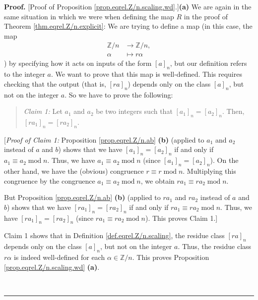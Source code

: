 \documentclass[numbers=enddot,12pt,final,onecolumn,notitlepage]{scrartcl}%
\numberwithin{exer}{subsection}
\theoremstyle{definition}
\newenvironment{statement}{\begin{quote}}{\end{quote}}
\newenvironment{proof}[1][Proof]{\noindent\textbf{#1.} }{\ \rule{0.5em}{0.5em}}
\begin{document}
\begin{proof}
[Proof of Proposition \ref{prop.eqrel.Z/n.scaling.wd}.]\textbf{(a)} We are
again in the same situation in which we were when defining the map $R$ in the
proof of Theorem \ref{thm.eqrel.Z/n.explicit}: We are trying to define a map
(in this case, the map%
\begin{align*}
\mathbb{Z}/n  &  \rightarrow\mathbb{Z}/n,\\
\alpha &  \mapsto r\alpha
\end{align*}
) by specifying how it acts on inputs of the form $\left[  a\right]  _{n}$,
but our definition refers to the integer $a$. We want to prove that this map
is well-defined. This requires checking that the output (that is, $\left[
ra\right]  _{n}$) depends only on the class $\left[  a\right]  _{n}$, but not
on the integer $a$. So we have to prove the following:

\begin{statement}
\textit{Claim 1:} Let $a_{1}$ and $a_{2}$ be two integers such that $\left[
a_{1}\right]  _{n}=\left[  a_{2}\right]  _{n}$. Then, $\left[  ra_{1}\right]
_{n}=\left[  ra_{2}\right]  _{n}$.
\end{statement}

[\textit{Proof of Claim 1:} Proposition \ref{prop.eqrel.Z/n.ab} \textbf{(b)}
(applied to $a_{1}$ and $a_{2}$ instead of $a$ and $b$) shows that we have
$\left[  a_{1}\right]  _{n}=\left[  a_{2}\right]  _{n}$ if and only if
$a_{1}\equiv a_{2}\operatorname{mod}n$. Thus, we have $a_{1}\equiv
a_{2}\operatorname{mod}n$ (since $\left[  a_{1}\right]  _{n}=\left[
a_{2}\right]  _{n}$). On the other hand, we have the (obvious) congruence
$r\equiv r\operatorname{mod}n$. Multiplying this congruence by the congruence
$a_{1}\equiv a_{2}\operatorname{mod}n$, we obtain $ra_{1}\equiv ra_{2}%
\operatorname{mod}n$.

But Proposition \ref{prop.eqrel.Z/n.ab} \textbf{(b)} (applied to $ra_{1}$ and
$ra_{2}$ instead of $a$ and $b$) shows that we have $\left[  ra_{1}\right]
_{n}=\left[  ra_{2}\right]  _{n}$ if and only if $ra_{1}\equiv ra_{2}%
\operatorname{mod}n$. Thus, we have $\left[  ra_{1}\right]  _{n}=\left[
ra_{2}\right]  _{n}$ (since $ra_{1}\equiv ra_{2}\operatorname{mod}n$). This
proves Claim 1.]

Claim 1 shows that in Definition \ref{def.eqrel.Z/n.scaling}, the residue
class $\left[  ra\right]  _{n}$ depends only on the class $\left[  a\right]
_{n}$, but not on the integer $a$. Thus, the residue class $r\alpha$ is indeed
well-defined for each $\alpha\in\mathbb{Z}/n$. This proves Proposition
\ref{prop.eqrel.Z/n.scaling.wd} \textbf{(a)}.


\end{proof}
\end{document}
